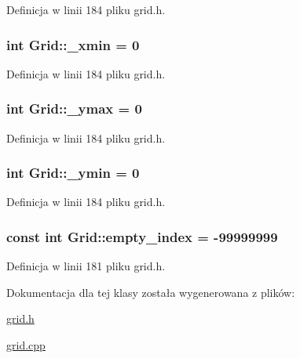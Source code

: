 Definicja w linii 184 pliku grid.\+h.

\hypertarget{class_grid_a293bb2eb514f57749e92d2dcf914ca57}{}
\subsubsection[{\+\_\+xmin}]{\setlength{\rightskip}{0pt plus 5cm}int Grid\+::\+\_\+xmin = 0\hspace{0.3cm}{\ttfamily [static]}}\label{class_grid_a293bb2eb514f57749e92d2dcf914ca57}


Definicja w linii 184 pliku grid.\+h.

\hypertarget{class_grid_ab4c6a5500c2540b48194a7bcdefab235}{}
\subsubsection[{\+\_\+ymax}]{\setlength{\rightskip}{0pt plus 5cm}int Grid\+::\+\_\+ymax = 0\hspace{0.3cm}{\ttfamily [static]}}\label{class_grid_ab4c6a5500c2540b48194a7bcdefab235}


Definicja w linii 184 pliku grid.\+h.

\hypertarget{class_grid_a6e548ba7ad924ef369c7fc24be04f0b2}{}
\subsubsection[{\+\_\+ymin}]{\setlength{\rightskip}{0pt plus 5cm}int Grid\+::\+\_\+ymin = 0\hspace{0.3cm}{\ttfamily [static]}}\label{class_grid_a6e548ba7ad924ef369c7fc24be04f0b2}


Definicja w linii 184 pliku grid.\+h.

\hypertarget{class_grid_a557878ff6ca7473b0a0acb3ae9c599cb}{}
\subsubsection[{empty\+\_\+index}]{\setlength{\rightskip}{0pt plus 5cm}const int Grid\+::empty\+\_\+index = -\/99999999\hspace{0.3cm}{\ttfamily [static]}}\label{class_grid_a557878ff6ca7473b0a0acb3ae9c599cb}


Definicja w linii 181 pliku grid.\+h.



Dokumentacja dla tej klasy została wygenerowana z plików\+:\begin{DoxyCompactItemize}
\item 
\hyperlink{grid_8h}{grid.\+h}\item 
\hyperlink{grid_8cpp}{grid.\+cpp}\end{DoxyCompactItemize}
